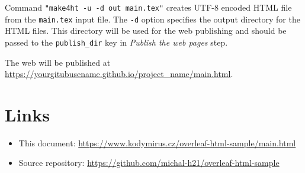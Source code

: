\documentclass{article}
\newcommand{\cmdname}[1]{\texttt{#1}}
\begin{document}
Command \verb|"make4ht -u -d out main.tex"| creates UTF-8 encoded HTML file
from the \cmdname{main.tex} input file. The \texttt{-d} option specifies the
output directory for the HTML files. This directory will be used for the web
publishing and should be passed to the \verb|publish_dir| key in
\textit{Publish the web pages} step.

The web will be published at \url{https://yourgitubusename.github.io/project_name/main.html}. 
\section{Links}
\begin{itemize}
    \item This document: \url{https://www.kodymirus.cz/overleaf-html-sample/main.html}
    \item Source repository: \url{https://github.com/michal-h21/overleaf-html-sample} 
\end{itemize}
 
\end{document}
